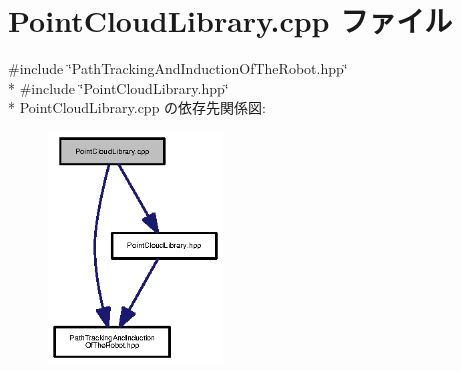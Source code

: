 \section{Point\-Cloud\-Library.\-cpp ファイル}
\label{_point_cloud_library_8cpp}
{\ttfamily \#include \char`\"{}Path\-Tracking\-And\-Induction\-Of\-The\-Robot.\-hpp\char`\"{}}\\*
{\ttfamily \#include \char`\"{}Point\-Cloud\-Library.\-hpp\char`\"{}}\\*
Point\-Cloud\-Library.\-cpp の依存先関係図\-:\nopagebreak
\begin{figure}[H]
\begin{center}
\leavevmode
\includegraphics[width=131pt]{_point_cloud_library_8cpp__incl}
\end{center}
\end{figure}
